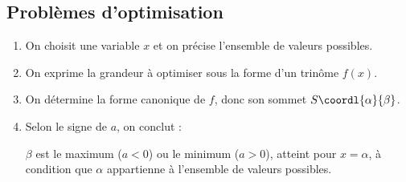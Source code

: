 \subsection{Problèmes d'optimisation}

\begin{methode}
	\nline
	\begin{enumerate}
		\item On choisit une variable $x$ et on précise l'ensemble de valeurs possibles.
		\item On exprime la grandeur à optimiser sous la forme d'un trinôme $f(x)$.
		\item On détermine la forme canonique de $f$, donc son sommet $S\coordl{\alpha}{\beta}$.
		\item Selon le signe de $a$, on conclut :

		      $\beta$ est le maximum ($a < 0$) ou le minimum ($a > 0$), atteint pour $x = \alpha$, à condition que $\alpha$ appartienne à l'ensemble de valeurs possibles.
	\end{enumerate}
\end{methode}

